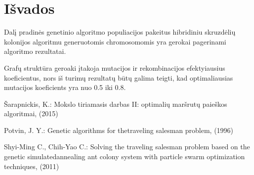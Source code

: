 \documentclass[runningheads,a4paper]{llncs}
\begin{document}
\section{Išvados}

Dalį pradinės genetinio algoritmo populiacijos pakeitus hibridiniu skruzdėlių kolonijos algoritmu generuotomis chromosomomis yra gerokai pagerinami algoritmo rezultatai.

Grafų struktūra geroaki įtakoja mutacijos ir rekombinacijos efektyiausius koeficientus, nors iš turimų rezultatų būtų galima teigti, kad optimaliausias mutacijos koeficients yra nuo 0.5 iki 0.8.



\begin{thebibliography}{4}

 Šarapnickis, K.: Mokslo tiriamasis darbas II: optimalių maršrutų paieškos algoritmai, (2015)

 Potvin, J. Y.: Genetic algorithms for thetraveling salesman problem, (1996)

 Shyi-Ming C., Chih-Yao C.: Solving the traveling salesman problem based on the genetic simulatedannealing ant colony system with particle swarm optimization techniques, (2011)

\end{thebibliography}
\end{document}
